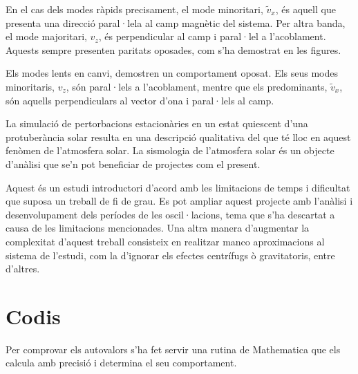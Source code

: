 \documentclass[12pt,a4paper]{article}
\numberwithin{equation}{section}
\begin{document}
En el cas dels modes ràpids precisament, el mode minoritari, $\tilde{v}_{x}$, és aquell que presenta una direcció paral·lela al camp magnètic del sistema.
Per altra banda, el mode majoritari, $v_z$, és perpendicular al camp i paral·lel a l'acoblament.
Aquests sempre presenten paritats oposades, com s'ha demostrat en les figures.

Els modes lents en canvi, demostren un comportament oposat. Els seus modes minoritaris, $v_z$, són paral·lels a l'acoblament,
mentre que els predominants, $\tilde{v}_{x}$, són aquells perpendiculars al vector d'ona i paral·lels al camp.

La simulació de pertorbacions estacionàries en un estat quiescent d'una protuberància solar resulta en una descripció qualitativa del que té lloc en aquest fenòmen de l'atmosfera solar.
La sismologia de l'atmosfera solar és un objecte d'anàlisi que se'n pot beneficiar de projectes com el present.

Aquest és un estudi introductori d'acord amb les limitacions de temps i dificultat que suposa un treball de fi de grau.
Es pot ampliar aquest projecte amb l'anàlisi i desenvolupament dels períodes de les oscil·lacions, tema que s'ha descartat a causa de les limitacions mencionades.
Una altra manera d'augmentar la complexitat d'aquest treball consisteix en realitzar manco aproximacions al sistema de l'estudi,
com la d'ignorar els efectes centrífugs ò gravitatoris, entre d'altres.






\clearpage



\printbibliography

\clearpage



\appendix
\section{Codis} \label{ap.A}
Per comprovar els autovalors s'ha fet servir una rutina de Mathematica que els calcula amb precisió i determina el seu comportament.
\end{document}
